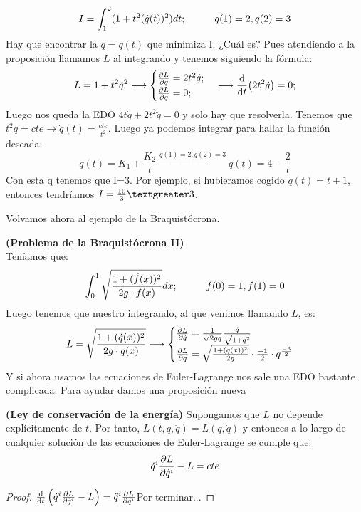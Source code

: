 \documentclass[palatino, bibnumbers]{apuntes}
\begin{document}
\begin{example}$$I=\int_{1}^{2}(1+t^2(\dot{q}(t))^2)dt;\hspace*{1cm} q(1)=2, q(2)=3$$
	Hay que encontrar la $q=q(t)$ que minimiza I. ¿Cuál es? Pues atendiendo a la proposición llamamos $L$ al integrando y tenemos siguiendo la fórmula: $$L=1+t^2\dot{q}^2\longrightarrow\begin{cases}
	\pdv{L}{\dot{q}}=2t^2\dot{q};\\
	\pdv{L}{q}=0;
	\end{cases}\longrightarrow\dv{t}(2t^2\dot{q})=0;$$
	Luego nos queda la EDO $4t\dot{q}+2t^2\ddot{q}=0$ y solo hay que resolverla. Tenemos que $t^2\dot{q}=cte\rightarrow \dot{q}(t)=\frac{cte}{t^2}$. Luego ya podemos integrar para hallar la función deseada: $$q(t)=K_1+\frac{K_2}{t}\xrightarrow{q(1)=2, q(2)=3}q(t)=4-\frac{2}{t}$$
Con esta q tenemos que I=3. Por ejemplo, si hubieramos cogido $q(t)=t+1$, entonces tendríamos $I=\frac{10}{3}\textgreater3$.\\
\end{example}
Volvamos ahora al ejemplo de la Braquistócrona.
\begin{example}\textbf{(Problema de la Braquistócrona II)}\\
Teníamos que:
$$\int_{0}^{1}\sqrt{\frac{1+(\dot{f}(x))^2}{2g\cdot f(x)}}dx;\hspace*{1cm} f(0)=1,f(1)=0$$ 
\newpage
Luego tenemos que nuestro integrando, al que venimos llamando $L$, es:
$$L=\sqrt{\frac{1+(\dot{q}(x))^2}{2g\cdot q(x)}}\longrightarrow\begin{cases}\pdv{L}{\dot{q}}=\frac{1}{\sqrt{2gq}}\frac{\dot{q}}{\sqrt{1+\dot{q}^2}}\\
\pdv{L}{q}=\sqrt{\frac{1+(\dot{q}(x))^2}{2g}}\cdot\frac{-1}{2}\cdot q^{\frac{-3}{2}}
\end{cases}$$
Y si ahora usamos las ecuaciones de Euler-Lagrange nos sale una EDO bastante complicada. Para ayudar damos una proposición nueva
\end{example}
\begin{prop}\textbf{(Ley de conservación de la energía)} Supongamos que $L$ no depende explícitamente de $t$. Por tanto, $L(t,q,\dot{q})=L(q,\dot{q})$ y entonces a lo largo de cualquier solución de las ecuaciones de Euler-Lagrange se cumple que:
\begin{equation}
\label{eq:ConservacionEnergia}
\dot{q}^i\pdv{L}{\dot{q}^i}-L=cte
\end{equation}
\end{prop}
\begin{proof}
	$\dv{t}\left(\dot{q}^i\pdv{L}{\dot{q}^i}-L\right)=\ddot{q}^i\pdv{L}{\dot{q}^i}$Por terminar...
\end{proof}
\end{document}
